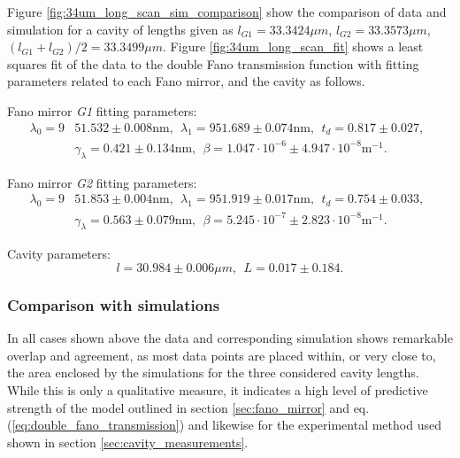 Figure \ref{fig:34um_long_scan_sim_comparison} show the comparison of data and simulation for a cavity of lengths given as $l_{G1} = 33.3424 \mu m$, $l_{G2} = 33.3573 \mu m$, $(l_{G1} + l_{G2})/2 = 33.3499 \mu m$. Figure \ref{fig:34um_long_scan_fit} shows a least squares fit of the data to the double Fano transmission function with fitting parameters related to each Fano mirror, and the cavity as follows.

Fano mirror \emph{G1} fitting parameters:
\begin{equation}
    \begin{split}
        \lambda_0 = 9&51.532 \pm 0.008 \text{nm}, \:\: \lambda_1 = 951.689 \pm 0.074 \text{nm}, \:\: t_d = 0.817 \pm 0.027, \:\: \\&\gamma_{\lambda} = 0.421 \pm 0.134 \text{nm}, \:\: \beta = 1.047 \cdot 10^{-6} \pm 4.947 \cdot 10^{-8} \text{m}^{-1}.
    \end{split}
\end{equation}

Fano mirror \emph{G2} fitting parameters:
\begin{equation}
    \begin{split}
        \lambda_0 = 9&51.853 \pm 0.004 \text{nm}, \:\: \lambda_1 = 951.919 \pm 0.017 \text{nm}, \:\: t_d = 0.754 \pm 0.033, \:\: \\&\gamma_{\lambda} = 0.563 \pm 0.079 \text{nm}, \:\: \beta = 5.245 \cdot 10^{-7} \pm 2.823 \cdot 10^{-8} \text{m}^{-1}.
    \end{split}
\end{equation}

Cavity parameters:
\begin{equation}
    l = 30.984 \pm 0.006 \mu m, \:\: L = 0.017 \pm 0.184.
\end{equation}

\subsubsection*{Comparison with simulations}

In all cases shown above the data and corresponding simulation shows remarkable overlap and agreement, as most data points are placed within, or very close to, the area enclosed by the simulations for the three considered cavity lengths. While this is only a qualitative measure, it indicates a high level of predictive strength of the model outlined in section \ref{sec:fano_mirror} and eq. (\ref{eq:double_fano_transmission}) and likewise for the experimental method used shown in section \ref{sec:cavity_measurements}.

